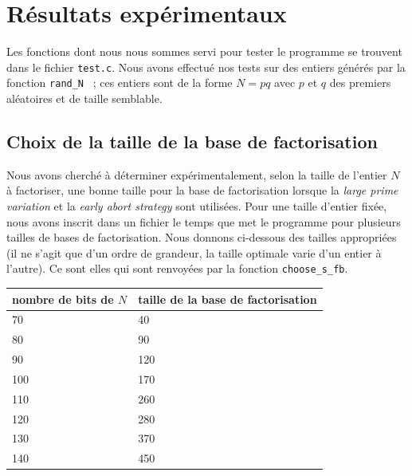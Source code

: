 \section{Résultats expérimentaux}

Les fonctions dont nous nous sommes servi pour tester le programme se trouvent
dans le fichier \texttt{test.c}. Nous avons effectué nos tests sur des entiers
générés par la fonction \texttt{rand\_N} ~; ces entiers sont de la forme $N =
pq$ avec $p$ et $q$ des premiers aléatoires et de taille semblable. 

\subsection{Choix de la taille de la base de factorisation}

Nous avons cherché à déterminer expérimentalement, selon la taille de l'entier
$N$ à factoriser, une bonne taille pour la base de factorisation lorsque la
\textit{large prime variation} et la \textit{early abort strategy} sont
utilisées. Pour une taille d'entier fixée, nous avons inscrit dans un fichier
le temps que met le programme pour plusieurs tailles de bases de factorisation.
Nous donnons ci-dessous des tailles appropriées (il ne s'agit que d'un ordre de
grandeur, la taille optimale varie d'un entier à l'autre). Ce sont elles qui
sont renvoyées par la fonction \texttt{choose\_s\_fb}.

\begin{center}
    \begin{tabular}{ |l |l | }
        \hline
        nombre de bits de $N$ & taille de la base de factorisation \\ \hline
        \hline
        70                    & 40                                 \\ \hline
        80                    & 90                                 \\ \hline
        90                    & 120                                \\ \hline 
        100                   & 170                                \\ \hline 
        110                   & 260                                \\ \hline 
        120                   & 280                                \\ \hline 
        130                   & 370                                \\ \hline 
        140                   & 450                                \\ \hline 
    \end{tabular}
\end{center}

